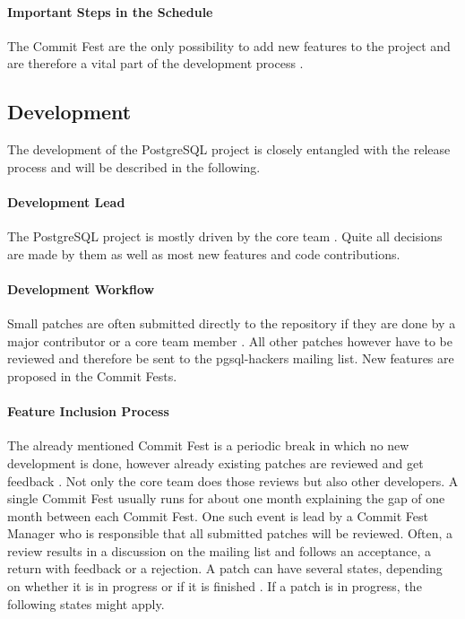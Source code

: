 \paragraph{Important Steps in the Schedule}

The Commit Fest are the only possibility to add new features to the project and
are therefore a vital part of the development process
\cite{PostgreSQLDevelopment,PostgreSQLCommitFest}. 

\subsection{Development}

The development of the PostgreSQL project is closely entangled with the release
process and will be described in the following.

\paragraph{Development Lead}

The PostgreSQL project is mostly driven by the core team
\cite{PostgreSQLDevFAQ,PostgreSQLFAQ,PostgreSQLContributors}. Quite all
decisions are made by them as well as most new features and code contributions.

\paragraph{Development Workflow}

Small patches are often submitted directly to the repository if they are done
by a major contributor or a core team member \cite{PostgreSQLDevFAQ}. All other
patches however have to be reviewed and therefore be sent to the pgsql-hackers
mailing list. New features are proposed in the Commit Fests.

\paragraph{Feature Inclusion Process}

The already mentioned Commit Fest is a periodic break in which no new
development is done, however already existing patches are reviewed and get
feedback \cite{PostgreSQLCommitFest}. Not only the core team does those reviews
but also other developers. A single Commit Fest usually runs for about one
month explaining the gap of one month between each Commit Fest. One such event
is lead by a Commit Fest Manager who is responsible that all submitted patches
will be reviewed. Often, a review results in a discussion on the mailing list
and follows an acceptance, a return with feedback or a rejection. A patch can
have several states, depending on whether it is in progress or if it is
finished \cite{PostgreSQLCommitFestRunning}. If a patch is in progress, the
following states might apply.

